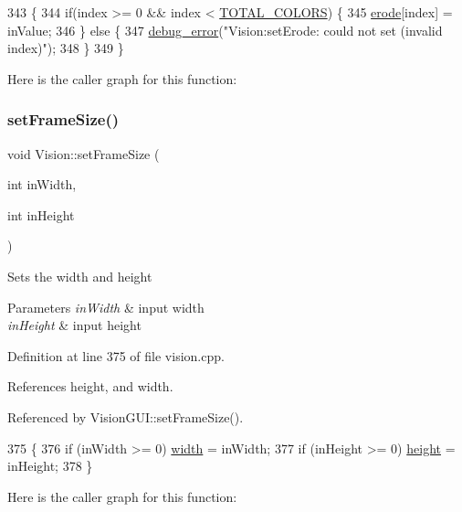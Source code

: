 \begin{DoxyCode}
343                                             \{
344     \textcolor{keywordflow}{if}(index >= 0 && index < \hyperlink{class_vision_a9fbea649a805b17ad9ea18f3f06c14f2}{TOTAL\_COLORS}) \{
345         \hyperlink{class_vision_a441302204181d31885b611e10ea92489}{erode}[index] = inValue;
346     \} \textcolor{keywordflow}{else} \{
347         \hyperlink{debug_8hpp_ab163a9e3f1ed9f61bd7d743fdf4a161a}{debug\_error}(\textcolor{stringliteral}{"Vision:setErode: could not set (invalid index)"});
348     \}
349 \}
\end{DoxyCode}
Here is the caller graph for this function\+:
\mbox{\label{class_vision_a363ee40ff45ed78c4895df2d42ef2d84}} 
\subsubsection{\texorpdfstring{set\+Frame\+Size()}{setFrameSize()}}
{\footnotesize\ttfamily void Vision\+::set\+Frame\+Size (\begin{DoxyParamCaption}\item[{int}]{in\+Width,  }\item[{int}]{in\+Height }\end{DoxyParamCaption})}

Sets the width and height 
\begin{DoxyParams}{Parameters}
{\em in\+Width} & input width \\
\hline
{\em in\+Height} & input height \\
\hline
\end{DoxyParams}


Definition at line 375 of file vision.\+cpp.



References height, and width.



Referenced by Vision\+G\+U\+I\+::set\+Frame\+Size().


\begin{DoxyCode}
375                                                    \{
376     \textcolor{keywordflow}{if} (inWidth >= 0) \hyperlink{class_vision_ac82a1da77a8b08d112e5c4688bd70c3d}{width} = inWidth;
377     \textcolor{keywordflow}{if} (inHeight >= 0) \hyperlink{class_vision_aa6f52191ab439505b6156835594f1861}{height} = inHeight;
378 \}
\end{DoxyCode}
Here is the caller graph for this function\+:
\mbox{\label{class_vision_a3c3ebea1a7c54c69f2da94b78aaf79f1}} 
